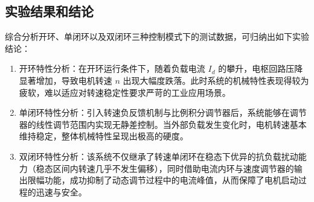 \begin{framed}
{			\section{实验结果和结论}
			
			综合分析开环、单闭环以及双闭环三种控制模式下的测试数据，可归纳出如下实验结论：
			\begin{enumerate}
				\item 开环特性分析：在开环运行条件下，随着负载电流 $I_d$ 的攀升，电枢回路压降显著增加，导致电机转速 $n$ 出现大幅度跌落。此时系统的机械特性表现得较为疲软，难以适应对转速稳定性要求严苛的工业应用场景。
				\item 单闭环特性分析：引入转速负反馈机制与比例积分调节器后，系统能够在调节器的线性调节范围内实现无静差控制。当外部负载发生变化时，电机转速基本维持稳定，整体机械特性呈现出极高的硬度。
				\item 双闭环特性分析：该系统不仅继承了转速单闭环在稳态下优异的抗负载扰动能力（稳态区间内转速几乎不发生偏移），同时借助电流内环与速度调节器的输出限幅功能，成功抑制了动态调节过程中的电流峰值，从而保障了电机启动过程的迅速与安全。
			\end{enumerate}
			
		}
	\end{framed}
